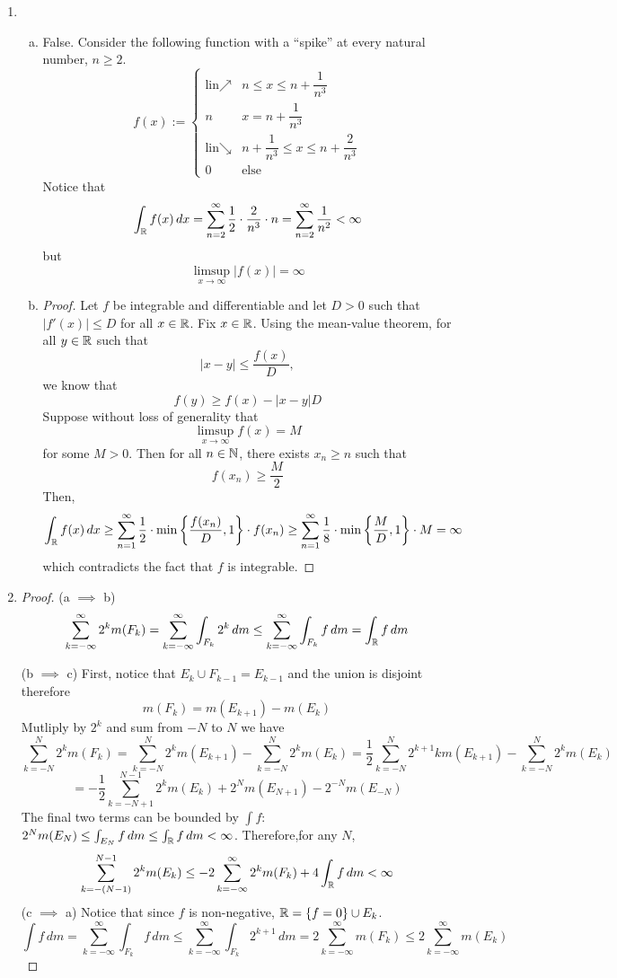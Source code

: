 \begin{enumerate}
\item \begin{enumerate}[(a)]
	\item False. Consider the following function with a ``spike'' at every natural number, $n \ge 2$.
			\[ f(x) := \left\{ \begin{array}{ll} \text{lin}\nearrow & n \le x \le n + \dfrac 1{n^3} \\
				n & x= n+ \dfrac 1{n^3} \\
				\text{lin}\searrow & n + \dfrac 1{n^3} \le x \le n + \dfrac 2{n^3} \\
				0 & \text{else} \end{array} \right. \]
		Notice that
			\[ \int_{\mathbb{R}} f(x) \, dx = \sum_{n=2}^\infty \dfrac 12 \cdot \dfrac 2{n^3} \cdot n = \sum_{n=2}^\infty \dfrac1{n^2} < \infty \]
		but
			\[ \limsup_{x \to \infty} |f(x)| = \infty \]
	\item \begin{proof}
		Let $f$ be integrable and differentiable and let $D >0$ such that $|f'(x)| \le D$ for all $x \in \mathbb{R}$. 
		Fix $x \in \mathbb{R}$. Using the mean-value theorem, for all $y \in \mathbb{R}$ such that
			\[ |x-y| \le \dfrac{f(x)}{D}, \]
		we know that
			\[ f(y) \ge f(x)-|x-y|D \]
		Suppose without loss of generality that
			\[ \limsup_{x\to\infty} f(x)  = M \]
		for some $M >0$. Then for all $n \in \mathbb{N}$, there exists $x_n \ge n$ such that
			\[ f(x_n) \ge \dfrac M2 \]
		Then,
			\[ \int_{\mathbb{R}} f(x) \, dx \ge \sum_{n=1}^\infty \dfrac 12 \cdot \min \left\{ \dfrac{f(x_n)}{D}, 1\right\} \cdot f(x_n) \ge \sum_{n=1}^\infty \dfrac 18 \cdot \min\left\{ \dfrac{M}{D},1\right\} \cdot M = \infty \]
		which contradicts the fact that $f$ is integrable.
	\end{proof}
\end{enumerate}

\item \begin{proof} (a $\implies$ b)
	\[ \sum_{k=-\infty}^\infty 2^k m(F_k) = \sum_{k=-\infty}^\infty \int_{F_k} 2^k \, dm \le \sum_{k=-\infty}^\infty \int_{F_k} f \, dm = \int_{\mathbb{R}} f \, dm \]
	
(b $\implies$ c) First, notice that $E_k \cup F_{k-1} = E_{k-1}$ and the union is disjoint therefore
	\[ m(F_k) = m(E_{k+1})-m(E_k) \]
Mutliply by $2^k$ and sum from $-N$ to $N$ we have
	\[\sum_{k=-N}^N 2^k m(F_k) = \sum_{k=-N}^N 2^k m(E_{k+1}) - \sum_{k=-N}^N 2^k m(E_k) = \dfrac 12 \sum_{k=-N}^N 2^{k+1}k m(E_{k+1}) - \sum_{k=-N}^N 2^k m(E_k) \]
	\[= -\dfrac 12 \sum_{k=-N+1}^{N-1}2^k m(E_k) + 2^N m(E_{N+1}) - 2^{-N}m(E_{-N}) \]
The final two terms can be bounded by $\int f$: $2^N m(E_N) \le \int_{E_N} f \, dm \le \int_{\mathbb{R}} f \, dm <\infty$. Therefore,for any $N$,
	\[ \sum_{k=-(N-1)}^{N-1} 2^k m(E_k) \le -2 \sum_{k=-\infty}^\infty 2^k m(F_k) + 4 \int_{\mathbb{R}} f \, dm  <\infty\]
(c $\implies$ a) Notice that since $f$ is non-negative, $\mathbb{R} = \{ f=0 \} \cup E_k $.
	\[ \int f \, dm = \sum_{k=-\infty}^\infty \int_{F_k} f \, dm \le \sum_{k=-\infty}^\infty \int_{F_k} 2^{k+1} \, dm = 2 \sum_{k=-\infty}^\infty m(F_k) \le 2 \sum_{k=-\infty}^\infty m(E_k) \]
\end{proof}

\end{enumerate}
